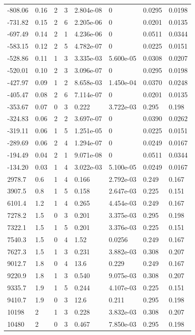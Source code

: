 \documentclass[preview]{standalone}
\begin{document}
{{\begin{tabular}{L{1.2cm}C{1.2cm} C{0.3cm}C{0.5cm} C{1.4cm}C{1.4cm} C{1.4cm}C{1.4cm}}
  -808.06  &  0.16  & 2     &  3 &  2.804e-08  & 0  & 0.0295 &  0.0198   \\ 
  -731.82  &  0.15  & 2     &  6 &  2.205e-06  & 0  & 0.0201 &  0.0135   \\ 
  -697.49  &  0.14  & 2     &  1 &  4.236e-06  & 0  & 0.0511 &  0.0344   \\ 
  -583.15  &  0.12  & 2     &  5 &  4.782e-07  & 0  & 0.0225 &  0.0151   \\ 
  -528.86  &  0.11  & 1     &  3 &  3.335e-03  & 5.600e-05  & 0.0308 &  0.0207   \\ 
  -520.01  &  0.10  & 2     &  3 &  3.096e-07  & 0  & 0.0295 &  0.0198   \\ 
  -427.97  &  0.09  & 1     &  2 &  8.658e-03  & 1.450e-04  & 0.0370 &  0.0248   \\ 
  -405.47  &  0.08  & 2     &  6 &  7.114e-07  & 0  & 0.0201 &  0.0135   \\ 
  -353.67  &  0.07  & 0     &  3 &  0.222  & 3.722e-03  & 0.295 &  0.198   \\ 
  -324.83  &  0.06  & 2     &  2 &  3.697e-07  & 0  & 0.0390 &  0.0262   \\ 
  -319.11  &  0.06  & 1     &  5 &  1.251e-05  & 0  & 0.0225 &  0.0151   \\ 
  -289.69  &  0.06  & 2     &  4 &  1.294e-07  & 0  & 0.0249 &  0.0167   \\ 
  -194.49  &  0.04  & 2     &  1 &  9.071e-08  & 0  & 0.0511 &  0.0344   \\ 
  -134.20  &  0.03  & 1     &  4 &  3.022e-03  & 5.100e-05  & 0.0249 &  0.0167   \\ 
  2978.7  &   0.6  & 1     &  4 &  0.166  & 2.792e-03  & 0.249 &  0.167   \\ 
  3907.5  &   0.8  & 1     &  5 &  0.158  & 2.647e-03  & 0.225 &  0.151   \\ 
  6101.4  &   1.2  & 1     &  4 &  0.265  & 4.454e-03  & 0.249 &  0.167   \\ 
  7278.2  &   1.5  & 0     &  3 &  0.201  & 3.375e-03  & 0.295 &  0.198   \\ 
  7322.1  &   1.5  & 1     &  5 &  0.201  & 3.376e-03  & 0.225 &  0.151   \\ 
  7540.3  &   1.5  & 0     &  4 &  1.52  & 0.0256  & 0.249 &  0.167   \\ 
  7627.3  &   1.5  & 1     &  3 &  0.231  & 3.882e-03  & 0.308 &  0.207   \\ 
  9012.7  &   1.8  & 0     &  4 &  13.6  & 0.229  & 0.249 &  0.167   \\ 
  9220.9  &   1.8  & 1     &  3 &  0.540  & 9.075e-03  & 0.308 &  0.207   \\ 
  9335.7  &   1.9  & 1     &  5 &  0.244  & 4.107e-03  & 0.225 &  0.151   \\ 
  9410.7  &   1.9  & 0     &  3 &  12.6  & 0.211  & 0.295 &  0.198   \\ 
  10198  &     2  & 1     &  3 &  0.228  & 3.832e-03  & 0.308 &  0.207   \\ 
  10480  &     2  & 0     &  3 &  0.467  & 7.850e-03  & 0.295 &  0.198   \\ 
\hline 
\end{tabular} 

}}
\end{document}
